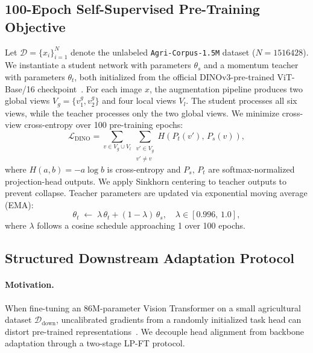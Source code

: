 \documentclass[10pt,twocolumn,letterpaper]{article}
\begin{document}
\subsection{100-Epoch Self-Supervised Pre-Training Objective}
\label{sec:pretrain}

Let $\mathcal{D} = \{x_i\}_{i=1}^{N}$ denote the unlabeled \texttt{Agri-Corpus-1.5M} dataset ($N = \num{1516428}$). We instantiate a student network with parameters $\theta_s$ and a momentum teacher with parameters $\theta_t$, both initialized from the official DINOv3-pre-trained ViT-Base/16 checkpoint~\cite{simeoni2025dinov3}. For each image $x$, the augmentation pipeline produces two global views $V_g = \{v_1^g, v_2^g\}$ and four local views $V_l$. The student processes all six views, while the teacher processes only the two global views. We minimize cross-view cross-entropy over 100 pre-training epochs:
\begin{equation}
  \mathcal{L}_{\mathrm{DINO}}
  = \sum_{v \in V_g \cup V_l}
    \sum_{\substack{v' \in V_g \\ v' \neq v}}
    H\!\left(P_t(v'),\, P_s(v)\right),
  \label{eq:dino}
\end{equation}
where $H(a,b) = -a\log b$ is cross-entropy and $P_s,\, P_t$ are softmax-normalized projection-head outputs. We apply Sinkhorn centering to teacher outputs to prevent collapse. Teacher parameters are updated via exponential moving average (EMA):
\begin{equation}
  \theta_t \;\leftarrow\; \lambda\,\theta_t + (1-\lambda)\,\theta_s,
  \quad \lambda \in [0.996,\, 1.0],
  \label{eq:ema}
\end{equation}
where $\lambda$ follows a cosine schedule approaching 1 over 100 epochs.

\subsection{Structured Downstream Adaptation Protocol}
\label{sec:lpft}

\paragraph{Motivation.}
When fine-tuning an 86M-parameter Vision Transformer on a small agricultural dataset $\mathcal{D}_{\mathrm{down}}$, uncalibrated gradients from a randomly initialized task head can distort pre-trained representations~\cite{kumar2022fine}. We decouple head alignment from backbone adaptation through a two-stage LP-FT protocol.
\end{document}
